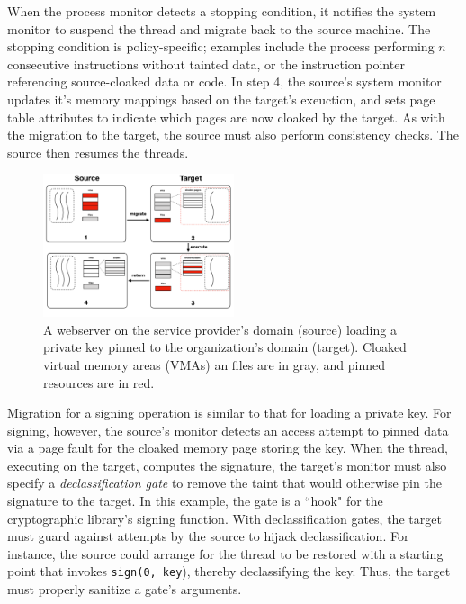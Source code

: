 When the process monitor detects a stopping condition, it notifies the
system monitor to suspend the thread and migrate back to the source machine.
%
The stopping condition is policy-specific; examples include the process
performing $n$ consecutive instructions without tainted
data, or the instruction pointer referencing source-cloaked data or code.
%
In step 4, the source's system monitor updates it's memory mappings based on
the target's exeuction, and sets page table attributes to indicate which pages
are now cloaked by the target.
%
As with the migration to the target, the source must also perform consistency
checks.
%
The source then resumes the threads.


\begin{figure}[t]
	\centering
    \includegraphics[width=0.5\textwidth]{figs/loading-key}
    \caption{A webserver on the service provider's domain (source) loading a
    private key pinned to the organization's domain (target).
    Cloaked virtual memory areas (VMAs) an files are in gray, and pinned
    resources are in red.
    }
	\label{fig:loading-key}
\end{figure}


%
Migration for a signing operation is similar to that for loading a
private key.
%
For signing, however, the source's monitor detects an 
access attempt to pinned data via a page fault for the cloaked memory page
storing the key.
%
When the thread, executing on the target, computes the signature, the target's
monitor must also specify a \emph{declassification gate} to remove the taint that
would otherwise pin the signature to the target.
%
In this example, the gate is a ``hook"  for the cryptographic library's
signing function.
%
With declassification gates, the target must guard against attempts by the source to
hijack declassification.
%
For instance, the source could arrange for the thread to be restored with a
starting point that invokes \texttt{sign(0, key}), thereby declassifying the key.
%
Thus, the target must properly sanitize a gate's arguments.



